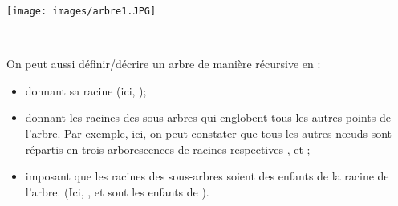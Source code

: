 \documentclass[11pt,a4paper,french,twoside]{PMCours}
\begin{document}
\begin{center}
\texttt{[image: images/arbre1.JPG]}
\end{center}
\ 
On peut aussi définir/décrire un arbre de manière récursive en :
\begin{itemize}
\item donnant sa racine (ici, );
\item donnant les racines des sous-arbres qui englobent tous les autres points de l'arbre. Par exemple, ici, on peut constater que tous les autres nœuds sont répartis en trois arborescences de racines respectives ,  et ;
\item imposant que les racines des sous-arbres soient des enfants de la racine de l'arbre. (Ici, \code{rep1}, \code{rep2} et \code{rep3} sont les enfants de \code{C}).
\end{itemize}
\end{document}
